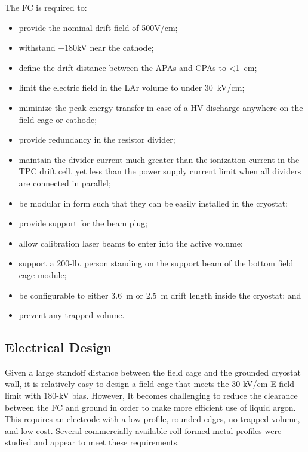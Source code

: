 The FC is required to:
\begin{itemize}
\item provide the nominal drift field of 500V/cm;
\item withstand $-$180kV near the cathode;
\item define the drift distance between the APAs and CPAs to <1~cm;
\item limit the electric field %
in the LAr volume to under 30~kV/cm;
\item miminize the peak energy transfer in case of a HV discharge anywhere on the field cage or cathode;
\item provide redundancy in the resistor divider; 
\item maintain the divider current %
much greater than the ionization current in the TPC drift cell, yet less than the power supply current limit when all dividers are connected in parallel;
\item %
be modular in form such that they can be easily installed in the cryostat;
\item provide support for the beam plug;
\item allow calibration laser beams to enter into the active volume; 
\item support a 200-lb. person standing on the support beam of the bottom field cage module;
\item be configurable to either 3.6~m or 2.5~m drift length inside the cryostat; and
\item %
prevent any trapped volume.

\end{itemize}

\subsection{Electrical Design}

Given a large standoff distance between the field cage and the grounded cryostat wall, it is relatively easy to design a field cage that meets the 30-kV/cm E field limit with 180-kV bias.  However, It becomes challenging %
to reduce the clearance between the FC and ground in order to make more efficient use of liquid argon.  %
This requires an electrode with a low profile, rounded edges, no trapped volume, and low cost.  Several commercially available roll-formed metal profiles were studied and appear to meet these requirements. 


